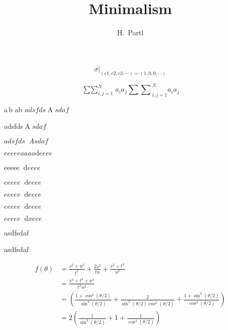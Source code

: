 \documentclass[UTF8]{article}
\author{H.~Partl}
\title{Minimalism}
\begin{document}
\begin{equation}
{\sigma |}_{(c1,c2,c3,\cdots)=(1,0,0,\cdots)}
\end{equation}

\begin{displaymath}
\mathop{\sum \sum}_{i,j=1}^{N} a_i a_j 
{\sum \sum}_{i,j=1}^{N} a_i a_j
\end{displaymath}

a\,b
a\!b
$adsfds\mathop{A}sdaf$

adsfds$\mathop{A}sdaf$

$adsfds\mathop{}Asdaf$

$eeeeeaaaa\!\mathrm{d}eeee$

eeeee$\mathop{}\!\mathrm{d}eeee$

$eeeee\mathop{}\!\mathrm{d}eeee$

$eeeee\mathop{} \mathrm{d}eeee$

$eeeee\mathop{}\mathrm{d}\!eeee$

$eeeee\mathop{}\mathrm{d}\!xeee$

    
    

    asdfsdaf

    asdfsdaf

    \begin{align}
        f(\theta) & =
        \frac{s^{2}+u^{2}}{t^{2}}+\frac{2 s^{2}}{t u}+\frac{s^{2}+t^{2}}{u^{2}} \nonumber \\ 
        & =
        \frac{s^{4}+t^{4}+u^{4}}{t^{2} u^{2}}      
        \nonumber \\
        & =
        \left(\frac{1+\cos ^{4}(\theta / 2)}{\sin ^{4}(\theta / 2)}+\frac{2}{\sin ^{2}(\theta / 2) \cos ^{2}(\theta / 2)}+\frac{1+\sin ^{4}(\theta / 2)}{\cos ^{4}(\theta / 2)}\right)
        \label{2.6.23} \\
        & =
        2\left(\frac{1}{\sin ^{4}(\theta / 2)}+1
        +\frac{1}{\cos ^{4}(\theta / 2)}\right) 
        \label{2.6.24}  
    \end{align}
\end{document}
